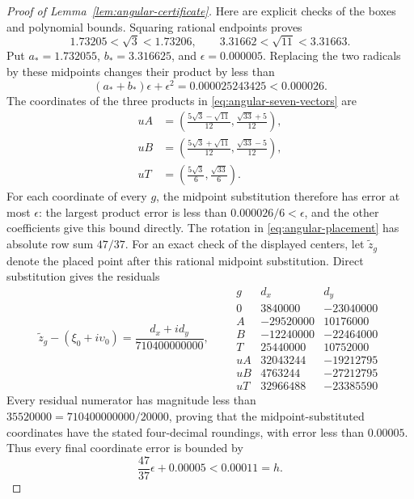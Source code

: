 \begin{proof}[Proof of Lemma~\ref{lem:angular-certificate}]
Here are explicit checks of the boxes and polynomial bounds.
Squaring rational endpoints proves
\[
 1.73205<\sqrt3<1.73206,\qquad
 3.31662<\sqrt{11}<3.31663.
\]
Put \(a_*=1.732055\), \(b_*=3.316625\), and
\(\epsilon=0.000005\).  Replacing the two radicals by
these midpoints changes their product by less than
\[
 (a_*+b_*)\epsilon+\epsilon^2
 =0.000025243425<0.000026.
\]
The coordinates of the three products in
\eqref{eq:angular-seven-vectors} are
\begin{align*}
 uA&=\left(\frac{5\sqrt3-\sqrt{11}}{12},
                 \frac{\sqrt{33}+5}{12}\right),\\
 uB&=\left(\frac{5\sqrt3+\sqrt{11}}{12},
                 \frac{\sqrt{33}-5}{12}\right),\\
 uT&=\left(\frac{5\sqrt3}{6},\frac{\sqrt{33}}6\right).
\end{align*}
For each coordinate of every \(g\), the midpoint substitution
therefore has error at most \(\epsilon\): the largest product
error is less than \(0.000026/6<\epsilon\), and the other
coefficients give this bound directly.  The rotation in
\eqref{eq:angular-placement} has absolute row sum \(47/37\).
For an exact check of the displayed centers, let
\(\widetilde z_g\) denote the placed point after this rational
midpoint substitution.  Direct substitution gives the residuals
\[
 \widetilde z_g-(\xi_0+i\upsilon_0)
       =\frac{d_x+i d_y}{710400000000},
 \qquad
 \begin{array}{c|rr}
 g&d_x&d_y\\\hline
 0&3840000&-23040000\\
 A&-29520000&10176000\\
 B&-12240000&-22464000\\
 T&25440000&10752000\\
 uA&32043244&-19212795\\
 uB&4763244&-27212795\\
 uT&32966488&-23385590
 \end{array}
\]
Every residual numerator has magnitude less than
\(35520000=710400000000/20000\), proving that the midpoint-substituted coordinates
have the stated four-decimal roundings, with error less than
\(0.00005\).  Thus every final coordinate error is bounded by
\[
 \frac{47}{37}\epsilon+0.00005<0.00011=h.
\]


\end{proof}

